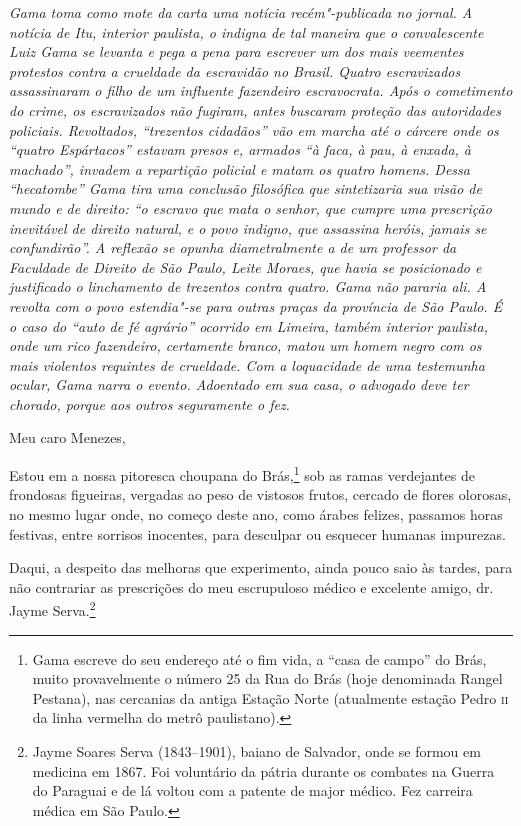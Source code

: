 \begin{flushleft}
{\footnotesize\itshape
Gama toma como mote da carta uma notícia recém"-publicada no
jornal. A notícia de Itu, interior paulista, o indigna de tal
maneira que o convalescente Luiz Gama se levanta e pega a pena para
escrever um dos mais veementes protestos contra a crueldade da
escravidão no Brasil. Quatro escravizados assassinaram o filho de um
influente fazendeiro escravocrata. Após o cometimento do crime, os
escravizados não fugiram, antes buscaram proteção das autoridades
policiais. Revoltados, ``trezentos cidadãos'' vão em marcha até o cárcere
onde os ``quatro Espártacos'' estavam presos e, armados ``à faca, à pau, à
enxada, à machado'', invadem a repartição policial e matam os quatro homens.
Dessa ``hecatombe'' Gama tira uma
conclusão filosófica que sintetizaria sua visão de mundo e de direito:
``o escravo que mata o senhor, que cumpre uma prescrição inevitável de
direito natural, e o povo indigno, que assassina heróis, jamais se
confundirão''. A reflexão se opunha diametralmente a de um professor da
Faculdade de Direito de São Paulo, Leite Moraes, que havia se
posicionado e justificado o linchamento de trezentos contra quatro. Gama
não pararia ali. A revolta com o povo
estendia"-se para outras praças
da província de São Paulo. É o caso do ``auto de fé agrário'' ocorrido em
Limeira, também interior paulista, onde um rico fazendeiro,
certamente branco, matou um homem negro com os mais violentos requintes de
crueldade. Com a loquacidade de uma testemunha
ocular, Gama narra o evento.
Adoentado em sua casa, o advogado deve ter chorado,
porque aos outros seguramente o fez. }
\end{flushleft}


\noindent{}Meu caro Menezes,\smallskip

Estou em a nossa pitoresca choupana do Brás,\footnote{Gama escreve do
  seu endereço até o fim vida, a ``casa de campo'' do Brás, muito
  provavelmente o número 25 da Rua do Brás (hoje denominada Rangel
  Pestana), nas cercanias da antiga Estação Norte (atualmente estação
  Pedro \textsc{ii} da linha vermelha do metrô paulistano).} sob as ramas
verdejantes de frondosas figueiras, vergadas ao peso de vistosos frutos,
cercado de flores olorosas, no mesmo lugar onde, no começo deste ano,
como árabes felizes, passamos horas festivas, entre sorrisos inocentes,
para desculpar ou esquecer humanas impurezas.

Daqui, a despeito das melhoras que experimento, ainda pouco saio às
tardes, para não contrariar as prescrições do meu escrupuloso médico e
excelente amigo, dr.\,Jayme Serva.\footnote{Jayme Soares Serva
  (1843--1901), baiano de Salvador, onde se formou em medicina em 1867.
  Foi voluntário da pátria durante os combates na Guerra do Paraguai e
  de lá voltou com a patente de major médico. Fez carreira médica em São
  Paulo.}

